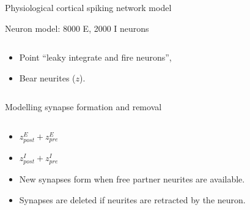 \begin{frame}[c]{Physiological cortical spiking network model}
  \begin{figure}[h]
    \def\svgwidth{0.7\textwidth}
    
  \end{figure}
\end{frame}
\begin{frame}[t]{Neuron model: 8000 E, 2000 I neurons}
  \begin{columns}
    \begin{column}{0.6\textwidth}
      \begin{itemize}
        \item Point \enquote{leaky integrate and fire neurons}\footnotemark[1]{}, 
        \item Bear neurites (\(z\)).
      \end{itemize}
    \end{column}
    \begin{column}{0.4\textwidth}
      
    \end{column}
  \end{columns}
\end{frame}
\begin{frame}[t]{Modelling synapse formation and removal}
  \begin{columns}
    \begin{column}{0.6\textwidth}
      \begin{itemize}
        \item \(z^E_{post} + z^E_{pre}\)
        \item \(z^I_{post} + z^I_{pre}\)
        \item New synapses form when \alert{free} partner neurites are available.
        \item Synapses are deleted if neurites are \alert{retracted} by the neuron.
      \end{itemize}
    \end{column}
    \begin{column}{0.4\textwidth}
      
    \end{column}
  \end{columns}
\end{frame}
